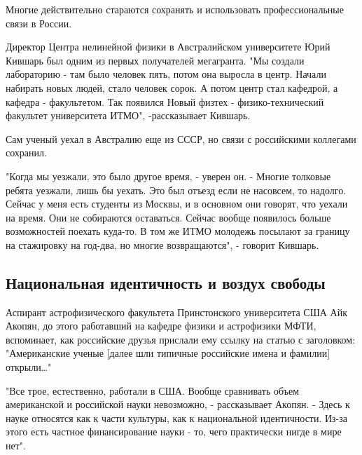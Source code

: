 Многие действительно стараются сохранять и использовать профессиональные связи в России.


Директор Центра нелинейной физики в Австралийском университете Юрий Кившарь был одним из первых получателей мегагранта. "Мы создали лабораторию - там было человек пять, потом она выросла в центр. Начали набирать новых людей, стало человек сорок. А потом центр стал кафедрой, а кафедра - факультетом. Так появился Новый физтех - физико-технический факультет университета ИТМО", -рассказывает Кившарь.

Сам ученый уехал в Австралию еще из СССР, но связи с российскими коллегами сохранил.

"Когда мы уезжали, это было другое время, - уверен он. - Многие толковые ребята уезжали, лишь бы уехать. Это был отъезд если не насовсем, то надолго. Сейчас у меня есть студенты из Москвы, и в основном они говорят, что уехали на время. Они не собираются оставаться. Сейчас вообще появилось больше возможностей поехать куда-то. В том же ИТМО молодежь посылают за границу на стажировку на год-два, но многие возвращаются", - говорит Кившарь.

\subsection{Национальная идентичность и воздух свободы}

Аспирант астрофизического факультета Принстонского университета США Айк Акопян, до этого работавший на кафедре физики и астрофизики МФТИ, вспоминает, как российские друзья прислали ему ссылку на статью с заголовком: "Американские ученые [далее шли типичные российские имена и фамилии] открыли…"

"Все трое, естественно, работали в США. Вообще сравнивать объем американской и российской науки невозможно, - рассказывает Акопян. - Здесь к науке относятся как к части культуры, как к национальной идентичности. Из-за этого есть частное финансирование науки - то, чего практически нигде в мире нет".

